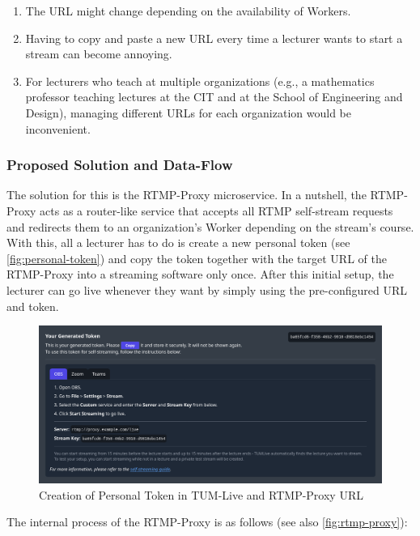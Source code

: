 \begin{enumerate}
    \item The URL might change depending on the availability of Workers.
    \item Having to copy and paste a new URL every time a lecturer wants to start a stream can become annoying.
    \item For lecturers who teach at multiple organizations (e.g., a mathematics professor teaching lectures at the \ac{CIT} and at the School of Engineering and Design), managing different URLs for each organization would be inconvenient.
\end{enumerate}

\subsubsection{Proposed Solution and Data-Flow}

The solution for this is the RTMP-Proxy microservice. In a nutshell, the RTMP-Proxy acts as a router-like service that accepts all \ac{RTMP} self-stream requests and redirects them to an organization's Worker depending on the stream's course. With this, all a lecturer has to do is create a new personal token (see \autoref{fig:personal-token}) and copy the token together with the target URL of the RTMP-Proxy into a streaming software only once.
After this initial setup, the lecturer can go live whenever they want by simply using the pre-configured URL and token.

\begin{figure}[htpb]
    \centering
    \includegraphics[width=\textwidth]{images/PersonalToken.png}
    \caption[Creation of Personal Token in TUM-Live and RTMP-Proxy URL]{Creation of Personal Token in TUM-Live and RTMP-Proxy URL}\label{fig:personal-token}
\end{figure}


The internal process of the RTMP-Proxy is as follows (see also \autoref{fig:rtmp-proxy}): 

